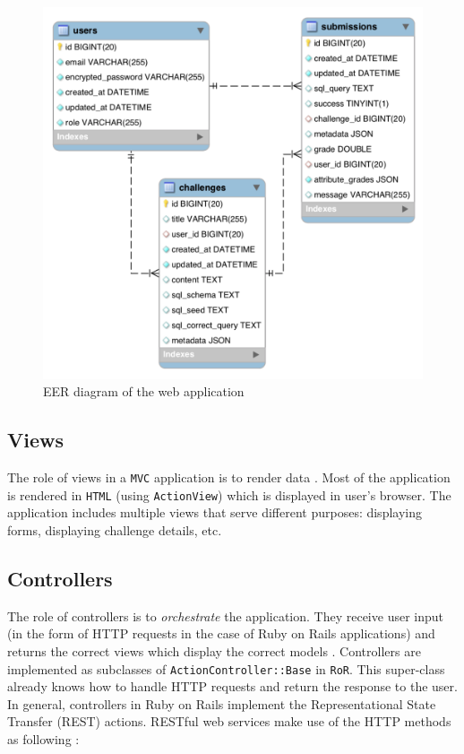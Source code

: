 \begin{figure}[h]
    \centering
    \includegraphics[width=\textwidth/3*2]{Chapters/4-Design/database_schema.png}
    \caption{EER diagram of the web application}
\end{figure}

\subsection{Views}

The role of views in a \texttt{MVC} application is to render data \citep{ruby_on_rails}. Most of the application is rendered in \texttt{HTML} (using \texttt{ActionView}) which is displayed in user's browser. The application includes multiple views that serve different purposes: displaying forms, displaying challenge details, etc.

\subsection{Controllers} \label{ch:design:web:controller}

The role of controllers is to \textit{orchestrate} the application. They receive user input (in the form of HTTP requests in the case of Ruby on Rails applications) and returns the correct views which display the correct models \citep{ruby_on_rails_book}. Controllers are implemented as subclasses of \texttt{ActionController::Base} in \texttt{RoR}. This super-class already knows how to handle HTTP requests and return the response to the user. In general, controllers in Ruby on Rails implement the Representational State Transfer (REST) actions. RESTful web services make use of the HTTP methods as following \citep{rodriguez2008restful}:

